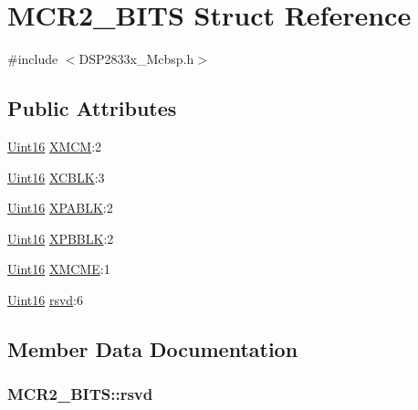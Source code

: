 \hypertarget{struct_m_c_r2___b_i_t_s}{}\section{M\+C\+R2\+\_\+\+B\+I\+T\+S Struct Reference}
\label{struct_m_c_r2___b_i_t_s}


{\ttfamily \#include $<$D\+S\+P2833x\+\_\+\+Mcbsp.\+h$>$}

\subsection*{Public Attributes}
\begin{DoxyCompactItemize}
\item 
\hyperlink{_d_s_p2833x___device_8h_a59a9f6be4562c327cbfb4f7e8e18f08b}{Uint16} \hyperlink{struct_m_c_r2___b_i_t_s_a9e488bb916be1b4489f92b1c5b5c01e2}{X\+M\+C\+M}\+:2
\item 
\hyperlink{_d_s_p2833x___device_8h_a59a9f6be4562c327cbfb4f7e8e18f08b}{Uint16} \hyperlink{struct_m_c_r2___b_i_t_s_a0f8891681f320e1aa8f5e857573039da}{X\+C\+B\+L\+K}\+:3
\item 
\hyperlink{_d_s_p2833x___device_8h_a59a9f6be4562c327cbfb4f7e8e18f08b}{Uint16} \hyperlink{struct_m_c_r2___b_i_t_s_ad9f7c8077d21a97611a5fd446d9e8335}{X\+P\+A\+B\+L\+K}\+:2
\item 
\hyperlink{_d_s_p2833x___device_8h_a59a9f6be4562c327cbfb4f7e8e18f08b}{Uint16} \hyperlink{struct_m_c_r2___b_i_t_s_ade3ee95c96b10a67cbf13345a23f3e17}{X\+P\+B\+B\+L\+K}\+:2
\item 
\hyperlink{_d_s_p2833x___device_8h_a59a9f6be4562c327cbfb4f7e8e18f08b}{Uint16} \hyperlink{struct_m_c_r2___b_i_t_s_a256b1e80f8b87f2b388f9c09e9038740}{X\+M\+C\+M\+E}\+:1
\item 
\hyperlink{_d_s_p2833x___device_8h_a59a9f6be4562c327cbfb4f7e8e18f08b}{Uint16} \hyperlink{struct_m_c_r2___b_i_t_s_a856100ee023d940d8395f4d148ed9a03}{rsvd}\+:6
\end{DoxyCompactItemize}


\subsection{Member Data Documentation}
\hypertarget{struct_m_c_r2___b_i_t_s_a856100ee023d940d8395f4d148ed9a03}{}
\subsubsection[{rsvd}]{ M\+C\+R2\+\_\+\+B\+I\+T\+S\+::rsvd}\label{struct_m_c_r2___b_i_t_s_a856100ee023d940d8395f4d148ed9a03}
\hypertarget{struct_m_c_r2___b_i_t_s_a0f8891681f320e1aa8f5e857573039da}{}
